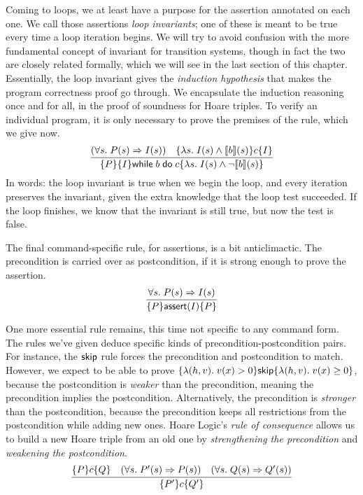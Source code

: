 \documentclass{amsbook}
\theoremstyle{definition}
\theoremstyle{remark}
\numberwithin{section}{chapter}
\numberwithin{equation}{chapter}
\begin{document}
Coming to loops, we at least have a purpose for the assertion annotated on each one.
\invariants
We call those assertions \emph{loop invariants}; one of these is meant to be true every time a loop iteration begins.
We will try to avoid confusion with the more fundamental concept of invariant for transition systems, though in fact the two are closely related formally, which we will see in the last section of this chapter.
Essentially, the loop invariant gives the \emph{induction hypothesis} that makes the program correctness proof go through.
We encapsulate the induction reasoning once and for all, in the proof of soundness for Hoare triples.
To verify an individual program, it is only necessary to prove the premises of the rule, which we give now.
$$\infer{\hoare{P}{\{I\} \while{b}{c}}{\lambda s. \; I(s) \land \neg \denote{b}(s)}}{
  (\forall s. \; P(s) \Rightarrow I(s))
  & \hoare{\lambda s. \; I(s) \land \denote{b}(s)}{c}{I}
}$$
In words: the loop invariant is true when we begin the loop, and every iteration preserves the invariant, given the extra knowledge that the loop test succeeded.
If the loop finishes, we know that the invariant is still true, but now the test is false.

The final command-specific rule, for assertions, is a bit anticlimactic.
The precondition is carried over as postcondition, if it is strong enough to prove the assertion.
$$\infer{\hoare{P}{\assert{I}}{P}}{
  \forall s. \; P(s) \Rightarrow I(s)
}$$

One more essential rule remains, this time not specific to any command form.
The rules we've given deduce specific kinds of precondition-postcondition pairs.
For instance, the $\mathsf{skip}$ rule forces the precondition and postcondition to match.
However, we expect to be able to prove $\{\lambda (h, v). \; v(x) > 0\} \mathsf{skip} \{\lambda (h, v). \; v(x) \geq 0\}$, because the postcondition is \emph{weaker} than the precondition, meaning the precondition implies the postcondition.
Alternatively, the precondition is \emph{stronger} than the postcondition, because the precondition keeps all restrictions from the postcondition while adding new ones.
Hoare Logic's \emph{rule of consequence} allows us to build a new Hoare triple from an old one by \emph{strengthening the precondition} and \emph{weakening the postcondition}.
$$\infer{\hoare{P'}{c}{Q'}}{
  \hoare{P}{c}{Q}
  & (\forall s. \; P'(s) \Rightarrow P(s))
  & (\forall s. \; Q(s) \Rightarrow Q'(s))
}$$
\end{document}
